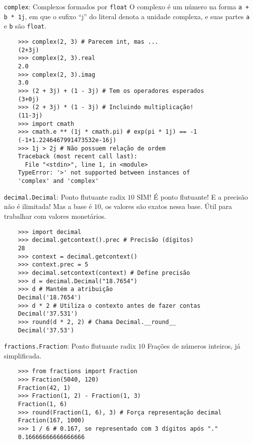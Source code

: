 \documentclass[utf8]{beamer}
\begin{document}
\begin{frame}[fragile]{\texttt{complex}:
                       Complexos formados por \texttt{float}}
  O complexo é um número na forma \texttt{a + b * 1j},
  em que o sufixo ``j'' do literal denota a unidade complexa,
  e suas partes \texttt{a} e \texttt{b}
  são \texttt{float}.

  \begin{verbatim}
    >>> complex(2, 3) # Parecem int, mas ...
    (2+3j)
    >>> complex(2, 3).real
    2.0
    >>> complex(2, 3).imag
    3.0
    >>> (2 + 3j) + (1 - 3j) # Tem os operadores esperados
    (3+0j)
    >>> (2 + 3j) * (1 - 3j) # Incluindo multiplicação!
    (11-3j)
    >>> import cmath
    >>> cmath.e ** (1j * cmath.pi) # exp(pi * 1j) == -1
    (-1+1.2246467991473532e-16j)
    >>> 1j > 2j # Não possuem relação de ordem
    Traceback (most recent call last):
      File "<stdin>", line 1, in <module>
    TypeError: '>' not supported between instances of
    'complex' and 'complex'
  \end{verbatim}

\end{frame}


\begin{frame}[fragile]{\texttt{decimal.Decimal}:
                       Ponto flutuante radix $10$}
  SIM! É ponto flutuante! E a precisão não é ilimitada!
  Mas a base é $10$, os valores são exatos nessa base.
  Útil para trabalhar com valores monetários.

  \begin{verbatim}
    >>> import decimal
    >>> decimal.getcontext().prec # Precisão (dígitos)
    28
    >>> context = decimal.getcontext()
    >>> context.prec = 5
    >>> decimal.setcontext(context) # Define precisão
    >>> d = decimal.Decimal("18.7654")
    >>> d # Mantém a atribuição
    Decimal('18.7654')
    >>> d * 2 # Utiliza o contexto antes de fazer contas
    Decimal('37.531')
    >>> round(d * 2, 2) # Chama Decimal.__round__
    Decimal('37.53')
  \end{verbatim}

\end{frame}


\begin{frame}[fragile]{\texttt{fractions.Fraction}:
                       Ponto flutuante radix $10$}
  Frações de números inteiros, já simplificada.

  \begin{verbatim}
    >>> from fractions import Fraction
    >>> Fraction(5040, 120)
    Fraction(42, 1)
    >>> Fraction(1, 2) - Fraction(1, 3)
    Fraction(1, 6)
    >>> round(Fraction(1, 6), 3) # Força representação decimal
    Fraction(167, 1000)
    >>> 1 / 6 # 0.167, se representado com 3 dígitos após "."
    0.16666666666666666
  \end{verbatim}

\end{frame}
\end{document}
